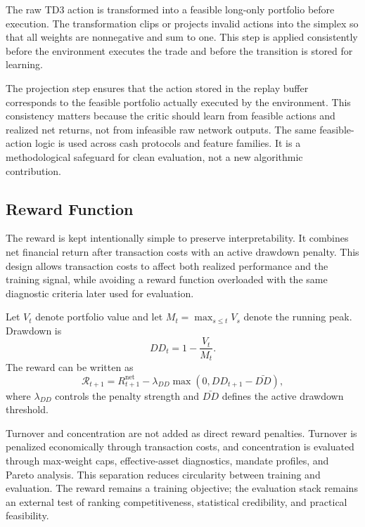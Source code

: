 \documentclass[12pt]{article}
\begin{document}
The raw TD3 action is transformed into a feasible long-only portfolio before execution. The transformation clips or projects invalid actions into the simplex so that all weights are nonnegative and sum to one. This step is applied consistently before the environment executes the trade and before the transition is stored for learning.

The projection step ensures that the action stored in the replay buffer corresponds to the feasible portfolio actually executed by the environment. This consistency matters because the critic should learn from feasible actions and realized net returns, not from infeasible raw network outputs. The same feasible-action logic is used across cash protocols and feature families. It is a methodological safeguard for clean evaluation, not a new algorithmic contribution.

\subsection{Reward Function}

The reward is kept intentionally simple to preserve interpretability. It combines net financial return after transaction costs with an active drawdown penalty. This design allows transaction costs to affect both realized performance and the training signal, while avoiding a reward function overloaded with the same diagnostic criteria later used for evaluation.

Let $V_t$ denote portfolio value and let $M_t=\max_{s\leq t}V_s$ denote the running peak. Drawdown is
\begin{equation}
    DD_t=1-\frac{V_t}{M_t}.
\end{equation}
The reward can be written as
\begin{equation}
    \mathcal{R}_{t+1}=R^{\mathrm{net}}_{t+1}-\lambda_{DD}\max\left(0,DD_{t+1}-\bar{DD}\right),
\end{equation}
where $\lambda_{DD}$ controls the penalty strength and $\bar{DD}$ defines the active drawdown threshold.

Turnover and concentration are not added as direct reward penalties. Turnover is penalized economically through transaction costs, and concentration is evaluated through max-weight caps, effective-asset diagnostics, mandate profiles, and Pareto analysis. This separation reduces circularity between training and evaluation. The reward remains a training objective; the evaluation stack remains an external test of ranking competitiveness, statistical credibility, and practical feasibility.
\end{document}
